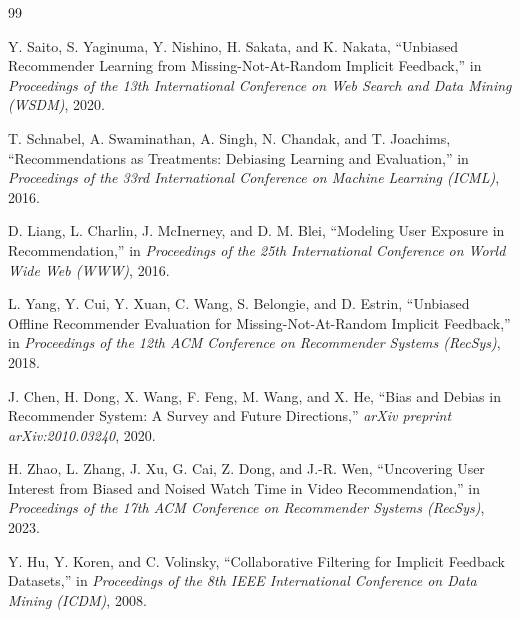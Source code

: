 \documentclass[12pt,a4paper]{article}
\begin{document}
\begin{thebibliography}{99}

Y. Saito, S. Yaginuma, Y. Nishino, H. Sakata, and K. Nakata,
``Unbiased Recommender Learning from Missing-Not-At-Random Implicit Feedback,''
in \textit{Proceedings of the 13th International Conference on Web Search and Data Mining (WSDM)}, 2020.

T. Schnabel, A. Swaminathan, A. Singh, N. Chandak, and T. Joachims,
``Recommendations as Treatments: Debiasing Learning and Evaluation,''
in \textit{Proceedings of the 33rd International Conference on Machine Learning (ICML)}, 2016.

D. Liang, L. Charlin, J. McInerney, and D. M. Blei,
``Modeling User Exposure in Recommendation,''
in \textit{Proceedings of the 25th International Conference on World Wide Web (WWW)}, 2016.

L. Yang, Y. Cui, Y. Xuan, C. Wang, S. Belongie, and D. Estrin,
``Unbiased Offline Recommender Evaluation for Missing-Not-At-Random Implicit Feedback,''
in \textit{Proceedings of the 12th ACM Conference on Recommender Systems (RecSys)}, 2018.

J. Chen, H. Dong, X. Wang, F. Feng, M. Wang, and X. He,
``Bias and Debias in Recommender System: A Survey and Future Directions,''
\textit{arXiv preprint arXiv:2010.03240}, 2020.

H. Zhao, L. Zhang, J. Xu, G. Cai, Z. Dong, and J.-R. Wen,
``Uncovering User Interest from Biased and Noised Watch Time in Video Recommendation,''
in \textit{Proceedings of the 17th ACM Conference on Recommender Systems (RecSys)}, 2023.

Y. Hu, Y. Koren, and C. Volinsky,
``Collaborative Filtering for Implicit Feedback Datasets,''
in \textit{Proceedings of the 8th IEEE International Conference on Data Mining (ICDM)}, 2008.

\end{thebibliography}
\end{document}
